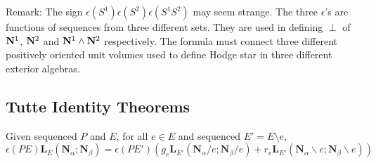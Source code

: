 \documentclass[Unicode]{cedram-alco}
\newcommand{\ext}[1]{\ensuremath{\mathbf{#1}}}
\newcommand{\eNal}{\ensuremath{\ext{N}_{\alpha}}}
\newcommand{\eNbe}{\ensuremath{\ext{N}_\beta}}
\newcommand{\extLHorSub}[3]{\ext{L}_{#1}\left(  {#2}; {#3}  \right)}
\begin{document}
Remark: The sign $\epsilon(S^{1})\epsilon(S^{2})\epsilon(S^{1}S^{2})$ may seem strange.
The three $\epsilon$'s are functions of sequences from three different sets.  They are
used  in defining $\perp$ of $\Nsup{1}$, $\Nsup{2}$ and $\Nsup{1}\wedge\Nsup{2}$ respectively.
The formula must connect three different positively oriented unit volumes
used to define Hodge star in three different exterior algebras.


\subsection{Tutte Identity Theorems}


\begin{theo}\label{delecontrtheorem}
  Given sequenced $P$ and $E$, for all $e\in E$ and sequenced $E'=E\setminus e$,
  \begin{equation}\label{delecontrequation}
     \epsilon(PE)\extLHorSub{E}{\eNal}{\eNbe}=
      \epsilon(PE')
      \left(
      g_e\extLHorSub{E'}{\eNal/e}{\eNbe/e} +
      r_e\extLHorSub{E'}{\eNal\backslash e}{\eNbe\backslash e}\right)
  \end{equation}
\end{theo}
\end{document}
